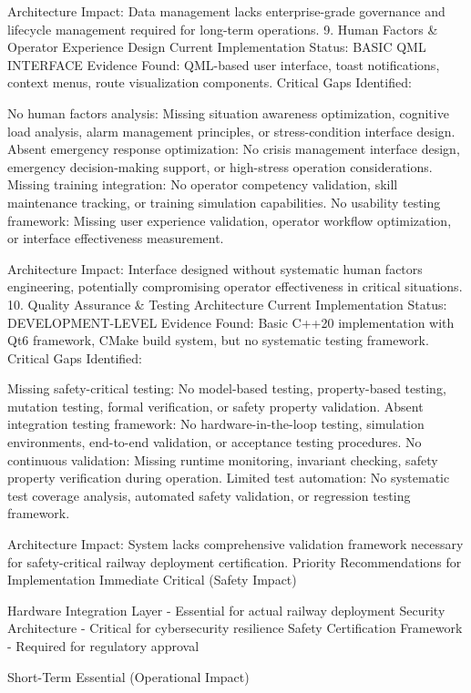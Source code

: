 Architecture Impact: Data management lacks enterprise-grade governance and lifecycle management required for long-term operations.
9. Human Factors & Operator Experience Design
Current Implementation Status: BASIC QML INTERFACE
Evidence Found: QML-based user interface, toast notifications, context menus, route visualization components.
Critical Gaps Identified:

No human factors analysis: Missing situation awareness optimization, cognitive load analysis, alarm management principles, or stress-condition interface design.
Absent emergency response optimization: No crisis management interface design, emergency decision-making support, or high-stress operation considerations.
Missing training integration: No operator competency validation, skill maintenance tracking, or training simulation capabilities.
No usability testing framework: Missing user experience validation, operator workflow optimization, or interface effectiveness measurement.

Architecture Impact: Interface designed without systematic human factors engineering, potentially compromising operator effectiveness in critical situations.
10. Quality Assurance & Testing Architecture
Current Implementation Status: DEVELOPMENT-LEVEL
Evidence Found: Basic C++20 implementation with Qt6 framework, CMake build system, but no systematic testing framework.
Critical Gaps Identified:

Missing safety-critical testing: No model-based testing, property-based testing, mutation testing, formal verification, or safety property validation.
Absent integration testing framework: No hardware-in-the-loop testing, simulation environments, end-to-end validation, or acceptance testing procedures.
No continuous validation: Missing runtime monitoring, invariant checking, safety property verification during operation.
Limited test automation: No systematic test coverage analysis, automated safety validation, or regression testing framework.

Architecture Impact: System lacks comprehensive validation framework necessary for safety-critical railway deployment certification.
Priority Recommendations for Implementation
Immediate Critical (Safety Impact)

Hardware Integration Layer - Essential for actual railway deployment
Security Architecture - Critical for cybersecurity resilience
Safety Certification Framework - Required for regulatory approval

Short-Term Essential (Operational Impact)

